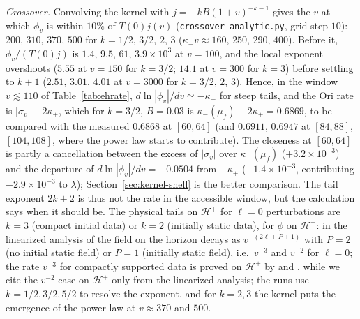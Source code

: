 \documentclass[11pt]{article}
\begin{document}
\emph{Crossover.} Convolving the kernel with $j=-kB(1+v)^{-k-1}$ gives the $v$ at which $\phi_v$ is within $10\%$ of $T(0)j(v)$ (\texttt{crossover\_analytic.py}, grid step $10$): $200,\,310,\,370,\,500$ for $k=1/2,\,3/2,\,2,\,3$ ($\kappa_-v\approx160,\,250,\,290,\,400$). Before it, $\phi_v/(T(0)j)$ is $1.4,\,9.5,\,61,\,3.9\times10^{3}$ at $v=100$, and the local exponent overshoots ($5.55$ at $v=150$ for $k=3/2$; $14.1$ at $v=300$ for $k=3$) before settling to $k+1$ ($2.51$, $3.01$, $4.01$ at $v=3000$ for $k=3/2$, $2$, $3$). Hence, in the window $v\lesssim110$ of Table~\ref{tab:ehrate}, $d\ln|\phi_v|/dv\simeq-\kappa_+$ for steep tails, and the Ori rate is $|\sigma_v|-2\kappa_+$, which for $k=3/2$, $B=0.03$ is $\kappa_-(\mu_f)-2\kappa_+=0.6869$, to be compared with the measured $0.6868$ at $[60,64]$ (and $0.6911$, $0.6947$ at $[84,88]$, $[104,108]$, where the power law starts to contribute). The closeness at $[60,64]$ is partly a cancellation between the excess of $|\sigma_v|$ over $\kappa_-(\mu_f)$ ($+3.2\times10^{-3}$) and the departure of $d\ln|\phi_v|/dv=-0.0504$ from $-\kappa_+$ ($-1.4\times10^{-3}$, contributing $-2.9\times10^{-3}$ to $\lambda$); Section~\ref{sec:kernel-shell} is the better comparison. The tail exponent $2k+2$ is thus not the rate in the accessible window, but the calculation says when it should be. The physical tails on $\mathcal H^+$ for $\ell=0$ perturbations are $k=3$ (compact initial data) or $k=2$ (initially static data), for $\phi$ on $\mathcal H^+$: in the linearized analysis of \citet{GundlachPricePullin1994a} the field on the horizon decays as $v^{-(2\ell+P+1)}$ with $P=2$ (no initial static field) or $P=1$ (initially static field), i.e.\ $v^{-3}$ and $v^{-2}$ for $\ell=0$; the rate $v^{-3}$ for compactly supported data is proved on $\mathcal H^+$ by \citet[Theorem~1.1: $|\phi|+|\partial_v\phi|\lesssim v^{-3+\epsilon}$]{DafermosRodnianski2005} and \citet[Eq.~(1.11): $\phi|_{\mathcal H^+}\sim-8I_0^{(1)}v^{-3}$]{AngelopoulosAretakisGajic2018}, while we cite the $v^{-2}$ case on $\mathcal H^+$ only from the linearized analysis; the runs use $k=1/2,3/2,5/2$ to resolve the exponent, and for $k=2,3$ the kernel puts the emergence of the power law at $v\approx370$ and $500$.
\end{document}
